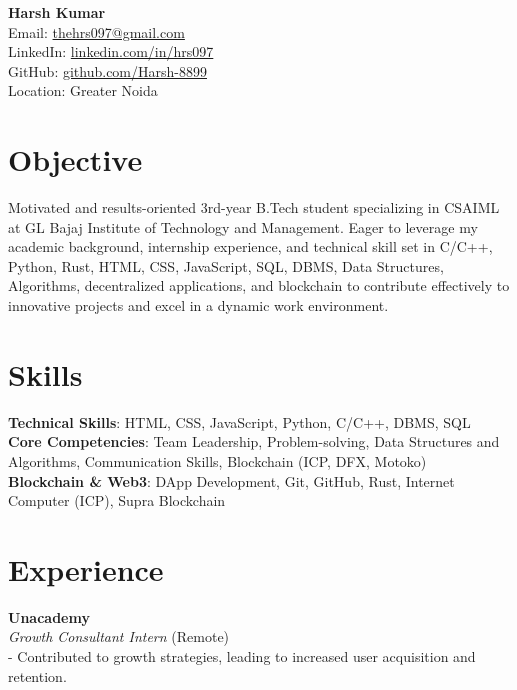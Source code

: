 \documentclass[10pt,a4paper]{article}
\begin{document}
\noindent
\textbf{\Huge Harsh Kumar} \\
Email: \href{mailto:thehrs097@gmail.com}{thehrs097@gmail.com} \\
LinkedIn: \href{https://linkedin.com/in/hrs097}{linkedin.com/in/hrs097} \\
GitHub: \href{https://github.com/Harsh-8899}{github.com/Harsh-8899} \\
Location: Greater Noida

\vspace{1cm}

\section*{Objective}
Motivated and results-oriented 3rd-year B.Tech student specializing in CSAIML at GL Bajaj Institute of Technology and Management. Eager to leverage my academic background, internship experience, and technical skill set in C/C++, Python, Rust, HTML, CSS, JavaScript, SQL, DBMS, Data Structures, Algorithms, decentralized applications, and blockchain to contribute effectively to innovative projects and excel in a dynamic work environment.

\vspace{1cm}

\section*{Skills}
\textbf{Technical Skills}: HTML, CSS, JavaScript, Python, C/C++, DBMS, SQL \\
\textbf{Core Competencies}: Team Leadership, Problem-solving, Data Structures and Algorithms, Communication Skills, Blockchain (ICP, DFX, Motoko) \\
\textbf{Blockchain \& Web3}: DApp Development, Git, GitHub, Rust, Internet Computer (ICP), Supra Blockchain

\vspace{1cm}

\section*{Experience}

\textbf{Unacademy} \\
\textit{Growth Consultant Intern} (Remote) \\
- Contributed to growth strategies, leading to increased user acquisition and retention.

\vspace{0.5cm}
\end{document}
